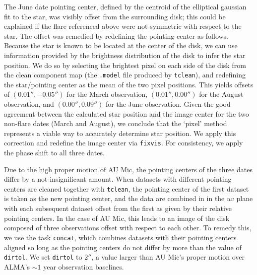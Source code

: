 \documentclass[11pt,modern]{aastex6}
\begin{document}
The June date pointing center, defined by the centroid of the elliptical
gaussian fit to the star, was visibly offset from the surrounding disk; this
could be explained if the flare referenced above were not symmetric with respect
to the star. The offset was remedied by redefining the pointing center as
follows. Because the star is known to be located at the center of the disk, we
can use information provided by the brightness distribution of the disk to infer
the star position. We do so by selecting the brightest pixel on each side of the
disk from the clean component map (the \texttt{.model} file produced by
\texttt{tclean}), and redefining the star/pointing center as the mean of the two
pixel positions. This yields offsets of $(0.01'', -0.05'')$ for the March
observation, $(0.01'', 0.00'')$ for the August observation, and $(0.00'',
0.09'')$ for the June observation. Given the good agreement between the
calculated star position and the image center for the two non-flare dates (March
and August), we conclude that the `pixel' method represents a viable way to
accurately determine star position. We apply this correction and redefine the
image center via \texttt{fixvis}. For consistency, we apply the phase shift to
all three dates.

Due to the high proper motion of AU Mic, the pointing centers of the three dates
differ by a not-insignificant amount. When datasets with different pointing
centers are cleaned together with \texttt{tclean}, the pointing center of the
first dataset is taken as the new pointing center, and the data are combined in
in the $uv$ plane with each subsequent dataset offset from the first as given by
their relative pointing centers. In the case of AU Mic, this leads to an  image
of the disk composed of three observations offset with respect to each other. To
remedy this, we use the task \texttt{concat}, which combines datasets with their
pointing centers aligned so long as the pointing centers do not differ by more
than the value of \texttt{dirtol}. We set \texttt{dirtol} to $ 2''$, a value
larger than  AU Mic's proper motion over ALMA's $\sim 1$ year observation
baselines.



% 
% 
\end{document}
